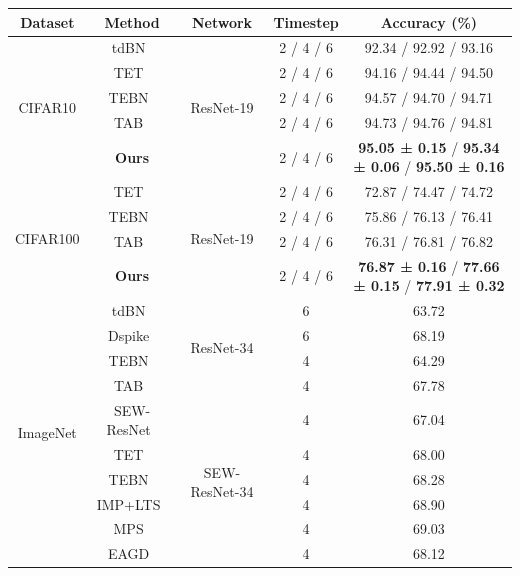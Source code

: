 \begin{table}[t!]
\centering
\small
\begin{tabular}{ccccc}
\toprule
\textbf{Dataset} & \textbf{Method} & \textbf{Network} & \textbf{Timestep} & \textbf{Accuracy (\%)} \\
\toprule
\multirow{5}{*}{CIFAR10} & tdBN~\cite{zheng:2021} & \multirow{5}{*}{ResNet-19} & 2 / 4 / 6 & 92.34 / 92.92 / 93.16 \\
& TET~\cite{deng:2022} & & 2 / 4 / 6 & 94.16 / 94.44 / 94.50 \\
& TEBN~\cite{tebn:2022} & & 2 / 4 / 6 & 94.57 / 94.70 / 94.71 \\
& TAB~\cite{tab:2024} & & 2 / 4 / 6 & 94.73 / 94.76 / 94.81 \\
& \textbf{Ours} & & 2 / 4 / 6 & \textbf{95.05 ± 0.15} / \textbf{95.34 ± 0.06} / \textbf{95.50 ± 0.16} \\
\midrule
\multirow{4}{*}{CIFAR100} & TET~\cite{deng:2022} & \multirow{4}{*}{ResNet-19} & 2 / 4 / 6 & 72.87 / 74.47 / 74.72 \\
& TEBN~\cite{tebn:2022} & & 2 / 4 / 6 & 75.86 / 76.13 / 76.41 \\
& TAB~\cite{tab:2024} & & 2 / 4 / 6 & 76.31 / 76.81 / 76.82 \\
& \textbf{Ours} & & 2 / 4 / 6 & \textbf{76.87 ± 0.16} / \textbf{77.66 ± 0.15} / \textbf{77.91 ± 0.32} \\
\midrule
\multirow{12}{*}{ImageNet} & tdBN~\cite{zheng:2021} & \multirow{4}{*}{ResNet-34} & 6 & 63.72 \\
& Dspike~\cite{li:2021} & & 6 & 68.19 \\
& TEBN~\cite{tebn:2022} & & 4 & 64.29 \\
& TAB~\cite{tab:2024} & & 4 & 67.78 \\
\addlinespace[1pt]
\cline{2-5}
\addlinespace[1pt]
& SEW-ResNet~\cite{fang:2021_2} & \multirow{6}{*}{SEW-ResNet-34} & 4 & 67.04 \\
& TET~\cite{deng:2022} & & 4 & 68.00 \\
& TEBN~\cite{tebn:2022} & & 4 & 68.28 \\
& IMP+LTS~\cite{shen:2024} & & 4 & 68.90 \\
& MPS~\cite{ding:2025} & & 4 & 69.03 \\
& EAGD~\cite{yang:2025} & & 4 & 68.12 \\


\end{tabular}
\end{table}
